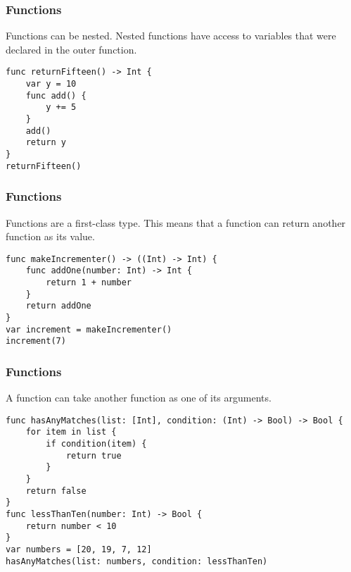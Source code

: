 \begin{frame}[fragile] \frametitle{Functions}
Functions can be nested. Nested functions have access to variables that were declared in the outer function.


\begin{lstlisting}
func returnFifteen() -> Int {
    var y = 10
    func add() {
        y += 5
    }
    add()
    return y
}
returnFifteen()
\end{lstlisting}


\end{frame}

\begin{frame}[fragile] \frametitle{Functions}

Functions are a first-class type. This means that a function can return another function as its value.
\begin{lstlisting}
func makeIncrementer() -> ((Int) -> Int) {
    func addOne(number: Int) -> Int {
        return 1 + number
    }
    return addOne
}
var increment = makeIncrementer()
increment(7)
\end{lstlisting}

\end{frame}


\begin{frame}[fragile] \frametitle{Functions}
A function can take another function as one of its arguments.

\begin{lstlisting}
func hasAnyMatches(list: [Int], condition: (Int) -> Bool) -> Bool {
    for item in list {
        if condition(item) {
            return true
        }
    }
    return false
}
func lessThanTen(number: Int) -> Bool {
    return number < 10
}
var numbers = [20, 19, 7, 12]
hasAnyMatches(list: numbers, condition: lessThanTen)
\end{lstlisting}

\end{frame}


